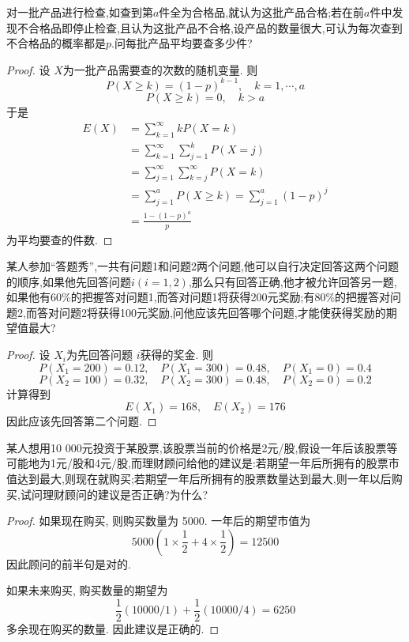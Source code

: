 \documentclass[../main.tex]{subfiles}
\begin{document}
\begin{exercise}{}{}
对一批产品进行检查,如查到第$a$件全为合格品,就认为这批产品合格;若在前$a$件中发现不合格品即停止检查,且认为这批产品不合格,设产品的数量很大,可认为每次查到不合格品的概率都是$p$.问每批产品平均要查多少件?
\end{exercise}
\begin{proof}
    设 \(  X  \)为一批产品需要查的次数的随机变量. 则 \[
    P\left( X\ge k \right)= \left( 1-p \right)^{k-1},\quad k=  1,\cdots,a   
    \] \[
    P\left( X\ge k \right)= 0,\quad k> a 
    \]于是 \[
   \begin{aligned}
    E\left( X \right)&= \sum _{k= 1}^{\infty} k P\left( X= k \right)   \\ 
     &=\sum _{k= 1}^{\infty}\sum _{j= 1}^{k}P\left( X= j \right)\\ 
      &= \sum _{j= 1}^{\infty}\sum _{k= j}^{\infty}P\left( X= k \right) \\ 
       &= \sum _{j= 1}^{a}P\left( X\ge k \right)= \sum _{j= 1}^{a}\left( 1-p \right)^{j}  \\ 
        &= \frac{1-\left( 1-p \right)^{a}  }{p } 
   \end{aligned}
    \]为平均要查的件数.
\end{proof}
\begin{exercise}{}{}
某人参加“答题秀”,一共有问题1和问题2两个问题,他可以自行决定回答这两个问题的顺序,如果他先回答问题$i(i=1,2)$,那么只有回答正确,他才被允许回答另一题,如果他有60\%的把握答对问题1,而答对问题1将获得200元奖励;有80\%的把握答对问题2,而答对问题2将获得100元奖励,问他应该先回答哪个问题,才能使获得奖励的期望值最大?
\end{exercise}
\begin{proof}
    设 \(  X_{i}  \)为先回答问题 \(  i  \)获得的奖金. 则 \[
    P\left( X_{1}= 200 \right)=  0.12,\quad P\left( X_1= 300 \right)= 0.48,\quad P\left( X_1= 0 \right)=   0.4
    \]   \[
    P\left( X_2= 100 \right)= 0.32,\quad P\left( X_2= 300 \right)= 0.48, \quad P\left( X_2= 0 \right)= 0.2   
    \]计算得到 \[
    E\left( X_1 \right)= 168,  \quad E\left( X_2 \right)= 176 
    \]因此应该先回答第二个问题.
\end{proof}
\begin{exercise}{}{}
某人想用10 000元投资于某股票,该股票当前的价格是2元/股,假设一年后该股票等可能地为1元/股和4元/股,而理财顾问给他的建议是:若期望一年后所拥有的股票市值达到最大,则现在就购买;若期望一年后所拥有的股票数量达到最大,则一年以后购买,试问理财顾问的建议是否正确?为什么?
\end{exercise}
\begin{proof}
    如果现在购买, 则购买数量为 5000. 一年后的期望市值为 \[
    5000\left( 1\times \frac{1 }{2 }+ 4\times \frac{1 }{2 }   \right)=  12500
    \]因此顾问的前半句是对的.

    如果未来购买, 购买数量的期望为 \[
    \frac{1 }{2 }\left( 10000/1 \right)+ \frac{1 }{2 }\left( 10000 /4 \right)= 6250    
    \]多余现在购买的数量. 因此建议是正确的.
\end{proof}
\end{document}
